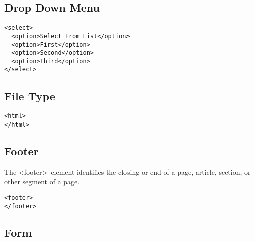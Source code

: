 \documentclass{article}
\begin{document}
\subsection{Drop Down Menu}
\begin{lstlisting}
<select>
  <option>Select From List</option>
  <option>First</option>
  <option>Second</option>
  <option>Third</option>
</select>
\end{lstlisting}

\subsection{File Type}
\begin{lstlisting}
<html>
</html>
\end{lstlisting}

\subsection{Footer}
The \textless footer\textgreater \ element identifies the closing or end of a
page, article, section, or other segment of a page.

\begin{lstlisting}
<footer>
</footer>
\end{lstlisting}

\subsection{Form}

\end{document}
